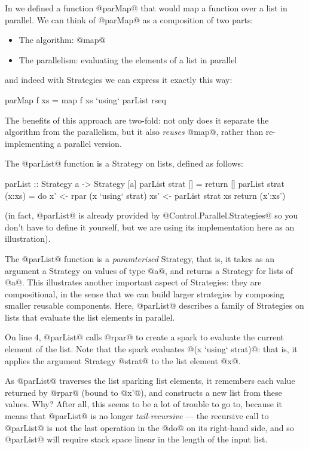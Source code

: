 
In  we defined a function @parMap@ that would map a
function over a list in parallel.  We can think of @parMap@ as a
composition of two parts:

\begin{itemize}
\item The algorithm: @map@
\item The parallelism: evaluating the elements of a list in parallel
\end{itemize}

\noindent and indeed with Strategies we can express it exactly this
way:

\begin{haskell}
parMap f xs = map f xs `using` parList rseq
\end{haskell}

\noindent The benefits of this approach are two-fold: not only does it
separate the algorithm from the parallelism, but it also \emph{reuses}
@map@, rather than re-implementing a parallel version.

The @parList@ function is a Strategy on lists, defined as follows:

\begin{haskell}
parList :: Strategy a -> Strategy [a]
parList strat []     = return []
parList strat (x:xs) = do
  x'  <- rpar (x `using` strat)
  xs' <- parList strat xs
  return (x':xs')
\end{haskell}

\noindent (in fact, @parList@ is already provided by
@Control.Parallel.Strategies@ so you don't have to define it yourself,
but we are using its implementation here as an illustration).

The @parList@ function is a \emph{paramterised} Strategy, that is, it
takes as an argument a Strategy on values of type @a@, and returns a
Strategy for lists of @a@.  This illustrates another important aspect
of Strategies: they are compositional, in the sense that we can build
larger strategies by composing smaller reusable components.  Here,
@parList@ describes a family of Strategies on lists that evaluate the
list elements in parallel.

On line 4, @parList@ calls @rpar@ to create a spark to evaluate the
current element of the list.  Note that the spark evaluates
@(x `using` strat)@: that is, it applies the argument Strategy @strat@ to
the list element @x@.

As @parList@ traverses the list sparking list elements, it remembers
each value returned by @rpar@ (bound to @x'@), and constructs a new
list from these values.  Why?  After all, this seems to be a lot of
trouble to go to, because it means that @parList@ is no longer
\emph{tail-recursive} --- the recursive call to @parList@ is not the
last operation in the @do@ on its right-hand side, and so @parList@
will require stack space linear in the length of the input list.

